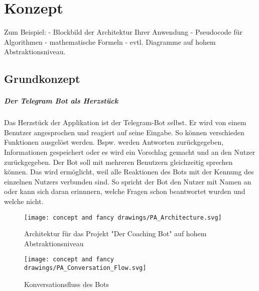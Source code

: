 \chapter{Konzept}

Zum Beispiel:  
- Blockbild der Architektur Ihrer Anwendung  
- Pseudocode für Algorithmen  
- mathematische Formeln  
- evtl. Diagramme auf hohem Abstraktionsniveau.  

\section{Grundkonzept}

	\paragraph{Der Telegram Bot als Herzstück}
 	Das Herzstück der Applikation ist der Telegram-Bot selbst. Er wird von einem Benutzer angesprochen und reagiert auf seine Eingabe. So können verschieden Funktionen ausgelöst werden. Bspw. werden Antworten zurückgegeben, Informationen gespeichert oder es wird ein Vorschlag gemacht und an den Nutzer zurückgegeben. Der Bot soll mit mehreren Benutzern gleichzeitig sprechen können. Das wird ermöglicht, weil alle Reaktionen des Bots mit der Kennung des einzelnen Nutzers verbunden sind. So spricht der Bot den Nutzer mit Namen an oder kann sich daran erinnnern, welche Fragen schon beantwortet wurden und welche nicht. 
	 
	 


 \begin{figure} %
	\centering
	\texttt{[image: concept and fancy drawings/PA\_Architecture.svg]}
	\caption{Architektur für das Projekt "Der Coaching Bot" auf hohem Abstraktionsniveau}
	\label{architecture}
\end{figure}


\begin{figure} %
	\centering
	\texttt{[image: concept and fancy drawings/PA\_Conversation\_Flow.svg]}
	\caption{Konversationsfluss des Bots}
	\label{conversationFlow}
\end{figure}


